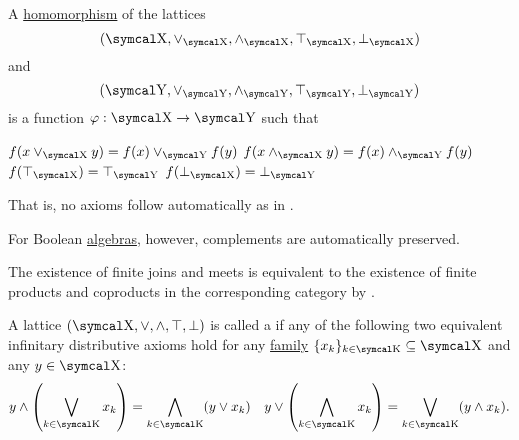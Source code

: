 \begin{proposition}\label{thm:lattice_homomorphism}
  A \hyperref[def:first_order_homomorphism]{homomorphism} of the lattices
  \begin{equation*}
    (\CX, \vee_{\CX}, \wedge_{\CX}, \top_{\CX}, \bot_{\CX})
  \end{equation*}
  and
  \begin{equation*}
    (\CY, \vee_{\CY}, \wedge_{\CY}, \top_{\CY}, \bot_{\CY})
  \end{equation*}
  is a function \( \varphi: \CX \to \CY \) such that
  \begin{PropEnum}
     \( f(x \vee_{\CX} y) = f(x) \vee_{\CY} f(y) \)
     \( f(x \wedge_{\CX} y) = f(x) \wedge_{\CY} f(y) \)
     \( f(\top_{\CX}) = \top_{\CY} \)
     \( f(\bot_{\CX}) = \bot_{\CY} \)
  \end{PropEnum}

  That is, no axioms follow automatically as in .

  For Boolean \hyperref[def:boolean_algebra]{algebras}, however, complements are automatically preserved.
\end{proposition}

\begin{remark}\label{def:lattice_categorical_product}
  The existence of finite joins and meets is equivalent to the existence of finite products and coproducts in the corresponding category by .
\end{remark}

\begin{definition}\label{def:distributive_lattice}
  A lattice \( (\CX, \vee, \wedge, \top, \bot) \) is called a  if any of the following two equivalent infinitary distributive axioms hold for any \hyperref[def:indexed_family]{family} \( \{ x_k \}_{k \in \CK} \subseteq \CX \) and any \( y \in \CX \):
  \begin{align}\label{eq:def:distributive_lattice/distributivity}
    y \wedge \left( \bigvee_{k \in \CK} x_k \right) = \bigwedge_{k \in \CK} (y \vee x_k)
     &  &
    y \vee \left( \bigwedge_{k \in \CK} x_k \right) = \bigvee_{k \in \CK} (y \wedge x_k).
  \end{align}
\end{definition}

